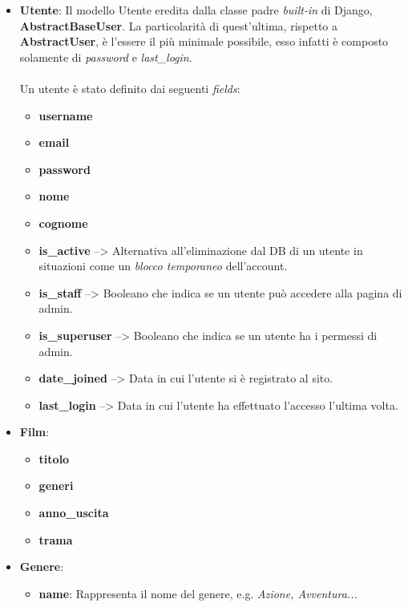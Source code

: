 \documentclass[12pt]{article}
\begin{document}
	\begin{itemize}
		\item \textbf{Utente}: Il modello Utente eredita dalla classe padre \textit{built-in} di Django, \textbf{AbstractBaseUser}. La particolarità di quest'ultima, rispetto a \textbf{AbstractUser}, è l'essere il più minimale possibile, esso infatti è composto solamente di \textit{password} e \textit{last\_login}.\\ \\
		Un utente è stato definito dai seguenti \textit{fields}:
		\begin{itemize}
			\item \textbf{username}
			\item \textbf{email}
			\item \textbf{password}
			\item \textbf{nome}
			\item \textbf{cognome}
			\item \textbf{is\_active} --> Alternativa all'eliminazione dal DB di un utente in situazioni come un \textit{blocco temporaneo} dell'account.
			\item \textbf{is\_staff} --> Booleano che indica se un utente può accedere alla pagina di admin.
			\item \textbf{is\_superuser} --> Booleano che indica se un utente ha i permessi di admin.
			\item \textbf{date\_joined} --> Data in cui l'utente si è registrato al sito.
			\item \textbf{last\_login} --> Data in cui l'utente ha effettuato l'accesso l'ultima volta.
		\end{itemize}
		
		\item \textbf{Film}:
		\begin{itemize}
			\item \textbf{titolo}
			\item \textbf{generi}
			\item \textbf{anno\_uscita}
			\item \textbf{trama} \\
		\end{itemize}
		
		
		\item \textbf{Genere}:
		\begin{itemize}
			\item \textbf{name}: Rappresenta il nome del genere, e.g. \textit{Azione, Avventura...} \\
		\end{itemize}
		

\end{itemize}
\end{document}

